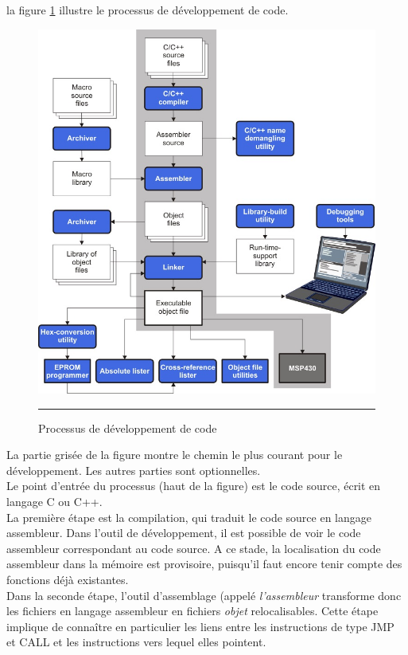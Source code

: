 la figure \ref{fig:develop_flow} illustre le processus de développement de code.
\begin{figure}[htb]
  \centering
  \includegraphics[angle=0, width=14cm]{./Figures/Assembleur/develop_flow.jpg}
  \rule{35em}{0.5pt}
  \caption[Schéma Timer]{Processus de développement de code}
  \label{fig:develop_flow}
\end{figure}

La partie grisée de la figure montre le chemin le plus courant pour le développement. Les autres parties sont optionnelles.\\

Le point d'entrée du processus (haut de la figure) est le code source, écrit en langage C ou C++.\\

La première étape est la compilation, qui traduit le code source en langage assembleur. Dans l'outil de développement, il est possible de voir le code assembleur correspondant au code source.
A ce stade, la localisation du code assembleur dans la mémoire est provisoire, puisqu'il faut encore tenir compte des fonctions déjà existantes.\\

Dans la seconde étape, l'outil d'assemblage (appelé \textit{l'assembleur} transforme donc les fichiers en langage assembleur en fichiers \textit{objet} relocalisables. Cette étape implique de connaître en particulier les liens entre les instructions de type {\selectfont JMP} et {\selectfont CALL} et les instructions vers lequel elles pointent.\\

